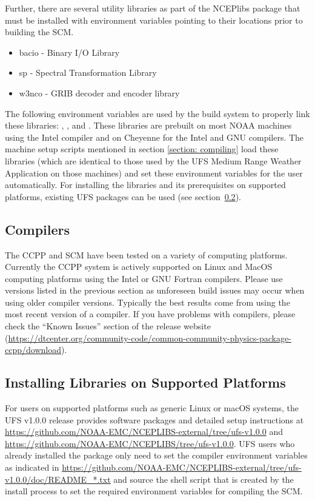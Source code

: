 Further, there are several utility libraries as part of the NCEPlibs package that must be installed with environment variables pointing to their locations prior to building the SCM.
\begin{itemize}
    \item bacio - Binary I/O Library
    \item sp - Spectral Transformation Library
    \item w3nco - GRIB decoder and encoder library
\end{itemize}
The following environment variables are used by the build system to properly link these libraries: , , and .  These libraries are prebuilt on most NOAA machines using the Intel compiler and on Cheyenne for the Intel and GNU compilers. The machine setup scripts mentioned in section \ref{section: compiling} load these libraries (which are identical to those used by the UFS Medium Range Weather Application on those machines) and set these environment variables for the user automatically. For installing the libraries and its prerequisites on supported platforms, existing UFS packages can be used (see section~\ref{section: setup_supported_platforms}).

\subsection{Compilers}
The CCPP and SCM have been tested on a variety of
computing platforms. Currently the CCPP system is actively supported
on Linux and MacOS computing platforms using the Intel or GNU Fortran
compilers. Please use versions listed in the previous section as unforeseen
build issues may occur when using older compiler versions. Typically the best results come from using the
most recent version of a compiler. If you have problems with compilers, please check the ``Known Issues'' section of the
release website (\url{https://dtcenter.org/community-code/common-community-physics-package-ccpp/download}).

\subsection{Installing Libraries on Supported Platforms}\label{section: setup_supported_platforms}
For users on supported platforms such as generic Linux or macOS systems, the UFS v1.0.0 release provides software packages and detailed setup instructions at \url{https://github.com/NOAA-EMC/NCEPLIBS-external/tree/ufs-v1.0.0} and \url{https://github.com/NOAA-EMC/NCEPLIBS/tree/ufs-v1.0.0}. UFS users who already installed the  package only need to set the compiler environment variables as indicated in \url{https://github.com/NOAA-EMC/NCEPLIBS-external/tree/ufs-v1.0.0/doc/README_*.txt} and source the shell script that is created by the  install process to set the required environment variables for compiling the SCM.

